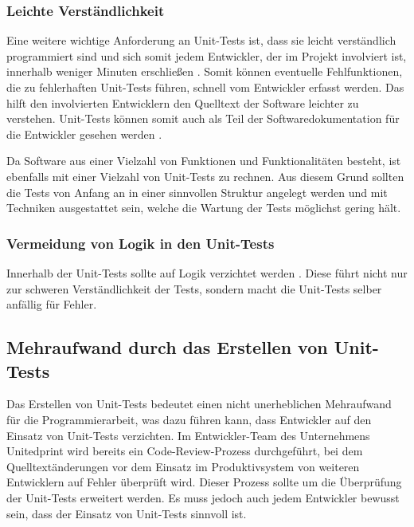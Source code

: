 \subsubsection*{Leichte Verständlichkeit}
Eine weitere wichtige Anforderung an Unit-Tests ist, dass sie leicht verständlich programmiert sind und sich somit jedem Entwickler, der im Projekt involviert ist, innerhalb weniger Minuten erschließen \autocite[vgl.][224]{Osherove2015}. Somit können eventuelle Fehlfunktionen, die zu fehlerhaften Unit-Tests führen, schnell vom Entwickler erfasst werden.
Das hilft den involvierten Entwicklern den Quelltext der Software leichter zu verstehen. Unit-Tests können somit auch als Teil der Softwaredokumentation für die Entwickler gesehen werden \autocite[vgl.][19]{Springer2015}.


Da Software aus einer Vielzahl von Funktionen und Funktionalitäten besteht, ist ebenfalls mit einer Vielzahl von Unit-Tests zu rechnen. Aus diesem Grund sollten die Tests von Anfang an in einer sinnvollen Struktur angelegt werden und mit Techniken ausgestattet sein, welche die Wartung der Tests möglichst gering hält.

\subsubsection*{Vermeidung von Logik in den Unit-Tests}
Innerhalb der Unit-Tests sollte auf Logik verzichtet werden \autocite[vgl.][197]{Osherove2015}. Diese führt nicht nur zur schweren Verständlichkeit der Tests, sondern macht die Unit-Tests selber anfällig für Fehler.

\subsection{Mehraufwand durch das Erstellen von Unit-Tests}
Das Erstellen von Unit-Tests bedeutet einen nicht unerheblichen Mehraufwand für die Programmierarbeit, was dazu führen kann, dass Entwickler auf den Einsatz von Unit-Tests verzichten. Im Entwickler-Team des Unternehmens Unitedprint wird bereits ein Code-Review-Prozess durchgeführt, bei dem Quelltextänderungen vor dem Einsatz im Produktivsystem von weiteren Entwicklern auf Fehler überprüft wird. Dieser Prozess sollte um die Überprüfung der Unit-Tests erweitert werden. Es muss jedoch auch jedem Entwickler bewusst sein, dass der Einsatz von Unit-Tests sinnvoll ist.
